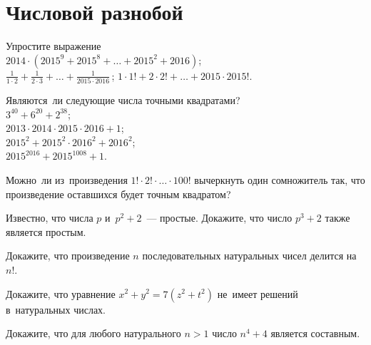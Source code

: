 
\section*{Числовой разнобой}


\begin{problems}

\item
Упростите выражение 
\\
\subproblem
\(
    2014 \cdot (2015^9 + 2015^8 + \ldots + 2015^2 + 2016)
\);
\\[0.5ex]
\subproblem
\(\displaystyle
    \frac{1}{1 \cdot 2} +
    \frac{1}{2 \cdot 3} +
    \ldots +
    \frac{1}{2015 \cdot 2016}
\)\,;
\qquad
\subproblem
\(
    1 \cdot 1! +
    2 \cdot 2! +
    \ldots +
    2015 \cdot 2015!
\).

\item
Являются~ли следующие числа точными квадратами?
\\
\subproblem
$3^{40} + 6^{20} + 2^{38}$;
\\
\subproblem
$2013 \cdot 2014 \cdot 2015 \cdot 2016 + 1$;
\\
\subproblem
$2015^2 + 2015^2 \cdot 2016^2 + 2016^2$;
\\
\subproblem
$2015^{2016} + 2015^{1008} + 1$.

\item
Можно~ли из~произведения $1! \cdot 2! \cdot \ldots \cdot 100!$ вычеркнуть один
сомножитель так, что произведение оставшихся будет точным квадратом?

\item
Известно, что числа $p$ и~$p^2 + 2$~--- простые.
Докажите, что число $p^3 + 2$ также является простым.

\item
Докажите, что произведение $n$ последовательных натуральных чисел делится
на~$n!$.


\item
Докажите, что уравнение $x^2 + y^2 = 7 (z^2 + t^2)$ не~имеет решений
в~натуральных числах.

\item
Докажите, что для любого натурального $n > 1$ число $n^4 + 4$ является
составным.


\end{problems}
